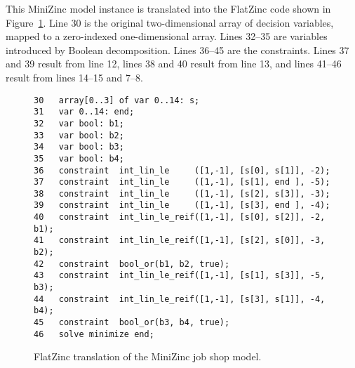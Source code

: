 \documentclass[10pt]{article}
\begin{document}
This MiniZinc model instance is translated into the FlatZinc code shown in
Figure~\ref{FlatZinc example}.
Line 30 is the original two-dimensional array of
decision variables, mapped to a zero-indexed one-dimensional array.
Lines 32--35 are variables introduced by Boolean decomposition.
Lines 36--45 are the constraints.
Lines 37 and 39 result from line 12, lines 38 and 40
result from line 13, and lines 41--46 result from lines 14--15 and 7--8.

\begin{figure}[t]
\begin{verbatim}
30   array[0..3] of var 0..14: s;
31   var 0..14: end;
32   var bool: b1;
33   var bool: b2;
34   var bool: b3;
35   var bool: b4;
36   constraint  int_lin_le     ([1,-1], [s[0], s[1]], -2);
37   constraint  int_lin_le     ([1,-1], [s[1], end ], -5);
38   constraint  int_lin_le     ([1,-1], [s[2], s[3]], -3);
39   constraint  int_lin_le     ([1,-1], [s[3], end ], -4);
40   constraint  int_lin_le_reif([1,-1], [s[0], s[2]], -2, b1);
41   constraint  int_lin_le_reif([1,-1], [s[2], s[0]], -3, b2);
42   constraint  bool_or(b1, b2, true);
43   constraint  int_lin_le_reif([1,-1], [s[1], s[3]], -5, b3);
44   constraint  int_lin_le_reif([1,-1], [s[3], s[1]], -4, b4);
45   constraint  bool_or(b3, b4, true);
46   solve minimize end;
\end{verbatim}
\caption{FlatZinc translation of the MiniZinc job shop model.}
\label{FlatZinc example}
\end{figure}
\end{document}
